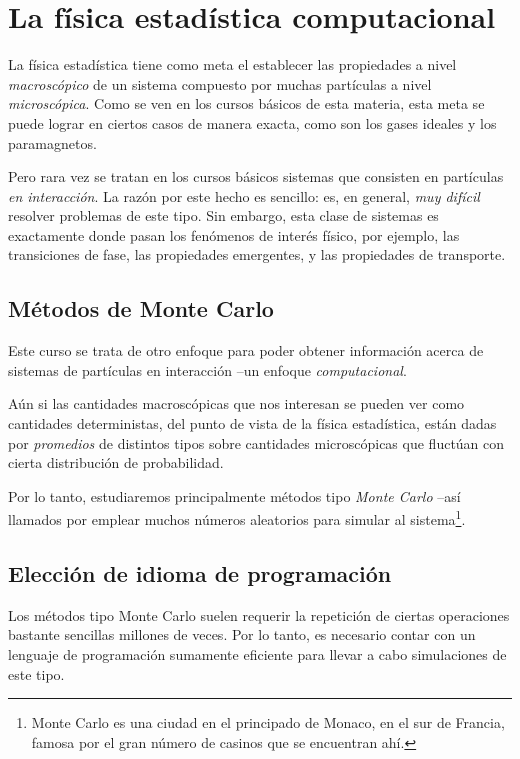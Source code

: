 \chapter{La física estadística computacional}

La física estadística tiene como meta el establecer las propiedades a nivel
\emph{macroscópico} de un sistema compuesto por muchas partículas a nivel
\emph{microscópica}. Como se ven en los cursos básicos de esta materia, esta
meta se puede lograr en ciertos casos de manera exacta, como son los gases
ideales y los paramagnetos.

Pero rara vez se tratan en los cursos básicos sistemas que consisten en
partículas \emph{en interacción}. La razón por este hecho es sencillo: es, en
general, \emph{muy difícil} resolver problemas de este tipo. Sin embargo, esta
clase de sistemas es exactamente donde pasan los fenómenos de interés físico,
por ejemplo, las transiciones de fase, las propiedades emergentes, y las
propiedades de transporte.



\section{Métodos de Monte Carlo} 
Este curso se trata de otro enfoque para poder obtener información acerca de
sistemas de partículas en interacción --un enfoque \emph{computacional}.

Aún si las cantidades macroscópicas que nos interesan se pueden ver como
cantidades deterministas, del punto de vista de la física estadística, están
dadas por \emph{promedios} de distintos tipos sobre cantidades microscópicas
que fluctúan con cierta distribución de probabilidad.  

Por lo tanto, estudiaremos principalmente métodos tipo \emph{Monte Carlo} --así
llamados por emplear muchos números aleatorios para simular al
sistema\footnote{Monte Carlo es una ciudad en el principado de Monaco, en el sur
de Francia, famosa por el gran número de casinos que se encuentran ahí.}.


\section{Elección de idioma de programación}
Los métodos tipo Monte Carlo suelen requerir la repetición de ciertas
operaciones bastante sencillas millones de veces. Por lo tanto, es necesario
contar con un lenguaje de programación sumamente eficiente para llevar a cabo
simulaciones de este tipo.

